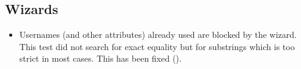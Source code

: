 

\subsection{Wizards}
\begin{itemize}
\item Usernames (and other attributes) already used are blocked by the wizard. 
  This test did not search for exact equality but for substrings which is too strict in most cases.
  This has been fixed ().
\end{itemize}


